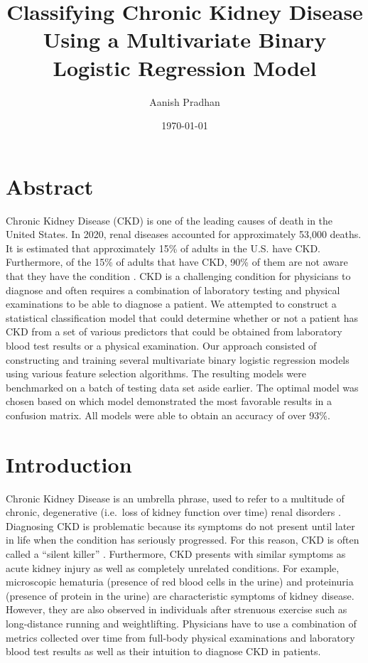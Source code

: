 \documentclass[
]{article}
\title{\textbf{Classifying Chronic Kidney Disease Using a Multivariate
Binary Logistic Regression Model}}
\author{Aanish Pradhan}
\date{\today}
\begin{document}
\maketitle

\setcounter{secnumdepth}{5}
\setcounter{tocdepth}{5}

\hypertarget{abstract}{%
\section{Abstract}\label{abstract}}

Chronic Kidney Disease (CKD) is one of the leading causes of death in
the United States. In 2020, renal diseases accounted for approximately
53,000 deaths. It is estimated that approximately 15\% of adults in the
U.S. have CKD. Furthermore, of the 15\% of adults that have CKD, 90\% of
them are not aware that they have the condition \autocite{CDC2021}. CKD
is a challenging condition for physicians to diagnose and often requires
a combination of laboratory testing and physical examinations to be able
to diagnose a patient. We attempted to construct a statistical
classification model that could determine whether or not a patient has
CKD from a set of various predictors that could be obtained from
laboratory blood test results or a physical examination. Our approach
consisted of constructing and training several multivariate binary
logistic regression models using various feature selection algorithms.
The resulting models were benchmarked on a batch of testing data set
aside earlier. The optimal model was chosen based on which model
demonstrated the most favorable results in a confusion matrix. All
models were able to obtain an accuracy of over 93\%.

\hypertarget{introduction}{%
\section{Introduction}\label{introduction}}

Chronic Kidney Disease is an umbrella phrase, used to refer to a
multitude of chronic, degenerative (i.e.~loss of kidney function over
time) renal disorders \autocite{Versino2019}. Diagnosing CKD is
problematic because its symptoms do not present until later in life when
the condition has seriously progressed. For this reason, CKD is often
called a ``silent killer'' \autocite{Kopyt2006}. Furthermore, CKD
presents with similar symptoms as acute kidney injury as well as
completely unrelated conditions. For example, microscopic hematuria
(presence of red blood cells in the urine) and proteinuria (presence of
protein in the urine) are characteristic symptoms of kidney disease.
However, they are also observed in individuals after strenuous exercise
such as long-distance running and weightlifting. Physicians have to use
a combination of metrics collected over time from full-body physical
examinations and laboratory blood test results as well as their
intuition to diagnose CKD in patients.
\end{document}
